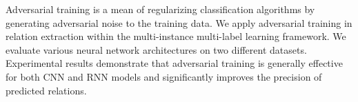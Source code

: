 Adversarial training is a mean of regularizing classification algorithms by generating adversarial noise to the training data. We apply adversarial training in relation extraction within the multi-instance multi-label learning framework. We evaluate various neural network architectures on two different datasets. Experimental results demonstrate that adversarial training is generally effective for both CNN and RNN models and significantly improves the precision of predicted relations.
